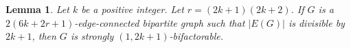 \documentclass[12pt,reqno,a4paper]{amsart}
\newtheorem{lemma}[theorem]{Lemma}
\begin{document}

\begin{lemma}\label{lemma:odd-strong-factorization}
	Let \(k\) be a positive integer. Let \(r = (2k+1)(2k+2)\).
	If \(G\) is a  \(2(6k + 2r+1)\)-edge-connected 
	bipartite graph such that \(|E(G)|\) is divisible by \(2k+1\),
	then \(G\) is strongly \((1,2k+1)\)-bifactorable.
\end{lemma}
\end{document}
